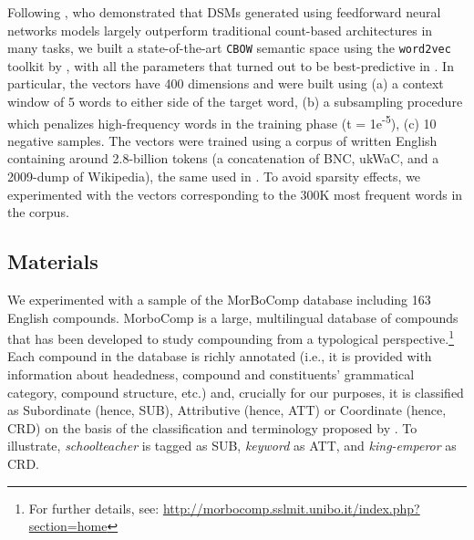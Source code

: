 Following \cite{baronipredict}, who demonstrated that DSMs generated using feedforward neural networks models largely outperform traditional count-based architectures in many tasks, we built a state-of-the-art \texttt{CBOW} semantic space using the \texttt{word2vec} toolkit by \cite{mikolov2013}, with all the parameters that turned out to be best-predictive in \cite{baronipredict}. In particular, the vectors have 400 dimensions and were built using (a) a context window of 5 words to either side of the target word, (b) a subsampling procedure which penalizes high-frequency words in the training phase (t = 1e\textsuperscript{-5}), (c) 10 negative samples. The vectors were trained using a corpus of written English containing around 2.8-billion tokens (a concatenation of BNC, ukWaC, and a 2009-dump of Wikipedia), the same used in \cite{baronipredict}. To avoid sparsity effects, we experimented with the vectors corresponding to the 300K most frequent words in the corpus.


\subsection{Materials}

We experimented with a sample of the MorBoComp database including 163 English compounds. MorboComp is a large, multilingual database of compounds that has been developed to study compounding from a typological perspective.\footnote{For further details, see: \url{http://morbocomp.sslmit.unibo.it/index.php?section=home}} Each compound in the database is richly annotated (i.e., it is provided with information about headedness, compound and constituents' grammatical category, compound structure, etc.) and, crucially for our purposes, it is classified as Subordinate (hence, SUB), Attributive (hence, ATT) or Coordinate (hence, CRD) on the basis of the classification and terminology proposed by \cite{SB2005}. To illustrate, \emph{schoolteacher} is tagged as SUB, \emph{keyword} as ATT, and \emph{king-emperor} as CRD.

